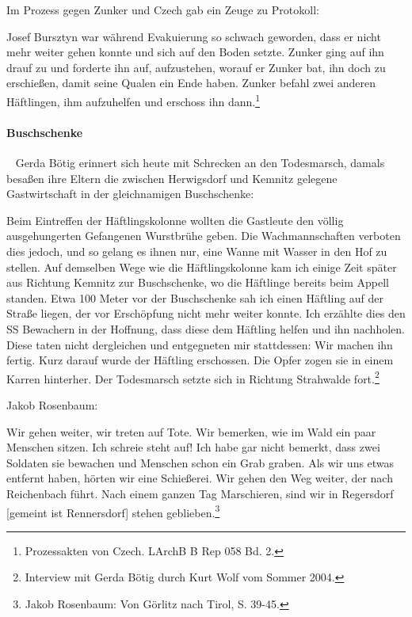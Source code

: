 Im Prozess gegen Zunker und Czech gab ein Zeuge zu Protokoll:
\begin{leftbar}   
Josef Bursztyn war während Evakuierung so schwach geworden, dass er nicht mehr weiter gehen konnte und sich auf den Boden setzte. Zunker ging auf ihn drauf zu und forderte ihn auf, aufzustehen, worauf er Zunker bat, ihn doch zu erschießen, damit seine Qualen ein Ende haben. Zunker befahl zwei anderen Häftlingen, ihm aufzuhelfen und erschoss ihn dann.\footnote{Prozessakten von Czech. LArchB B Rep 058 Bd. 2.}
\end{leftbar}

\paragraph{Buschschenke}
~\newline
Gerda Bötig erinnert sich heute mit Schrecken an den Todesmarsch, damals besaßen ihre Eltern die zwischen Herwigsdorf und Kemnitz gelegene Gastwirtschaft in der gleichnamigen Buschschenke:
\begin{leftbar}   
Beim Eintreffen der Häftlingskolonne wollten die Gastleute den völlig ausgehungerten Gefangenen Wurstbrühe geben. Die Wachmannschaften verboten dies jedoch, und so gelang es ihnen nur, eine Wanne mit Wasser in den Hof zu stellen. Auf demselben Wege wie die Häftlingskolonne kam ich einige Zeit später aus Richtung Kemnitz zur Buschschenke, wo die Häftlinge bereits beim Appell standen. Etwa 100 Meter vor der Buschschenke sah ich einen Häftling auf der Straße liegen, der vor Erschöpfung nicht mehr weiter konnte. Ich erzählte dies den SS Bewachern in der Hoffnung, dass diese dem Häftling helfen und ihn nachholen. Diese taten nicht dergleichen und entgegneten mir stattdessen: \glqq Wir machen ihn fertig\grqq.
Kurz darauf wurde der Häftling erschossen. Die Opfer zogen sie in einem Karren hinterher. Der Todesmarsch setzte sich in Richtung Strahwalde fort.\footnote{Interview mit Gerda Bötig durch Kurt Wolf vom Sommer 2004.}
\end{leftbar}

Jakob Rosenbaum: 
\begin{leftbar}   
Wir gehen weiter, wir treten auf Tote. Wir bemerken, wie im Wald ein paar Menschen sitzen. Ich schreie steht auf! Ich habe gar nicht bemerkt, dass zwei Soldaten sie bewachen und Menschen schon ein Grab graben. Als wir uns etwas entfernt haben, hörten wir eine Schießerei. Wir gehen den Weg weiter, der nach Reichenbach führt. Nach einem ganzen Tag Marschieren, sind wir in Regersdorf [gemeint ist Rennersdorf] stehen geblieben.\footnote{Jakob Rosenbaum: Von Görlitz nach Tirol, S. 39-45.}
\end{leftbar}

